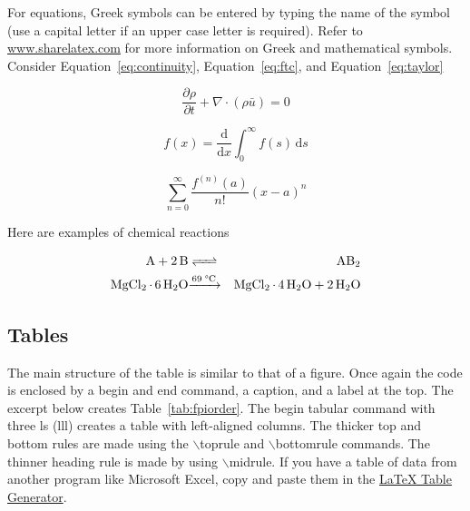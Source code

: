\documentclass[a4paper,12pt]{article}
\begin{document}
For equations, Greek symbols can be entered by typing the name of the symbol (use a capital letter if an upper case letter is required). Refer to \href{https://www.sharelatex.com/learn/List_of_Greek_letters_and_math_symbols}{www.sharelatex.com} for more information on Greek and mathematical symbols. Consider Equation~\ref{eq:continuity}, Equation~\ref{eq:ftc}, and Equation~\ref{eq:taylor}

\begin{equation}
\label{eq:continuity}
\frac{\partial \rho}{\partial t} + \nabla \cdot (\rho \bar{u}) = 0
\end{equation}

\begin{equation}
\label{eq:ftc}
f(x) = \frac{\mathrm{d}}{\mathrm{d}x} \int^\infty_0  f(s) \, \mathrm{d}s
\end{equation}

\begin{equation}
\label{eq:taylor}
\sum^\infty_{n=0} \frac{f^{(n)}(a)}{n!} (x-a)^n
\end{equation}

Here are examples of chemical reactions

\begin{eqnarray*}
  \ce{A + 2B &<=>& AB2} \\
  \ce{MgCl_2 {\cdot} 6 H_2O &\xrightarrow{69 \; {\degree C}}& MgCl_2 {\cdot} 4 H_2O + 2H_2O} \\
\end{eqnarray*}

\subsection{Tables}
The main structure of the table is similar to that of a figure. Once again the code is enclosed by a begin and end command, a caption, and a label at the top. The excerpt below creates Table~\ref{tab:fpiorder}. The begin tabular command with three ls (lll) creates a table with left-aligned columns. The thicker top and bottom rules are made using the $\backslash$toprule and $\backslash$bottomrule commands. The thinner heading rule is made by using $\backslash$midrule. If you have a table of data from another program like Microsoft Excel, copy and paste them in the \href{https://www.tablesgenerator.com/}{\LaTeX{} Table Generator}.
\end{document}
